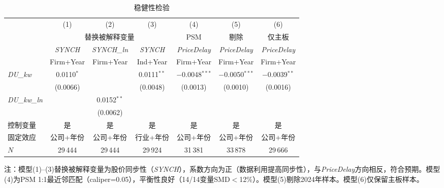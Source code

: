 \documentclass[11pt,a4paper]{article}
\begin{document}
\begin{table}[htbp]
\centering
\caption{稳健性检验}
\label{tab:robust}
\footnotesize
\setlength{\tabcolsep}{4pt}
\begin{tabular}{l*{6}{c}}
\toprule
 & (1) & (2) & (3) & (4) & (5) & (6) \\
 & \multicolumn{3}{c}{替换被解释变量} & PSM & 剔除 & 仅主板 \\
\cmidrule(lr){2-4}
 & \textit{SYNCH} & \textit{SYNCH\_ln} & \textit{SYNCH} & \textit{PriceDelay} & \textit{PriceDelay} & \textit{PriceDelay} \\
 & Firm+Year & Firm+Year & Ind+Year & Firm+Year & Firm+Year & Firm+Year \\
\midrule
\textit{DU\_kw}
 & 0.0110$^{*}$ & & 0.0111$^{**}$ & $-$0.0048$^{***}$ & $-$0.0050$^{***}$ & $-$0.0039$^{**}$ \\
 & (0.0066) & & (0.0048) & (0.0013) & (0.0010) & (0.0016) \\[4pt]
\textit{DU\_kw\_ln}
 & & 0.0152$^{**}$ & & & & \\
 & & (0.0062) & & & & \\[4pt]
\midrule
控制变量 & 是 & 是 & 是 & 是 & 是 & 是 \\
固定效应 & 公司+年份 & 公司+年份 & 行业+年份 & 公司+年份 & 公司+年份 & 公司+年份 \\
$N$ & 29\,444 & 29\,444 & 29\,924 & 31\,381 & 33\,878 & 29\,666 \\
\bottomrule
\end{tabular}

\vspace{4pt}
{\footnotesize 注：模型(1)--(3)替换被解释变量为股价同步性（\textit{SYNCH}），系数方向为正（数据利用提高同步性），与\textit{PriceDelay}方向相反，符合预期。模型(4)为PSM 1:1最近邻匹配（caliper=0.05），平衡性良好（14/14变量SMD$<$12\%）。模型(5)剔除2024年样本。模型(6)仅保留主板样本。}
\end{table}


\FloatBarrier
\end{document}
